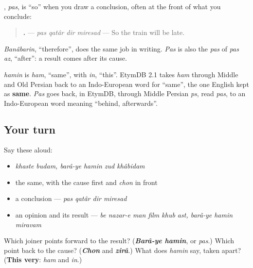 \begin{grammarlens}[title={Grammar Lens: pas, the short one}]
\textbf{}, \emph{pas}, is \textquotedblleft{}so\textquotedblright{} when you draw a conclusion, often at the front of what you conclude:

\begin{quote}
\textbf{   .} — \emph{pas qatâr dir miresad} — So the train will be late.
\end{quote}

\emph{Banâbarin}, \textquotedblleft{}therefore\textquotedblright{}, does the same job in writing. \emph{Pas} is also the \emph{pas} of \emph{pas az}, \textquotedblleft{}after\textquotedblright{}: a result comes after its cause.
\end{grammarlens}

\begin{cousinweb}
\emph{hamin} is \emph{ham}, \textquotedblleft{}same\textquotedblright{}, with \emph{in}, \textquotedblleft{}this\textquotedblright{}. EtymDB 2.1 takes \emph{ham} through Middle and Old Persian back to an Indo-European word for \textquotedblleft{}same\textquotedblright{}, the one English kept as \textbf{same}. \emph{Pas} goes back, in EtymDB, through Middle Persian \emph{ps}, read \emph{pas}, to an Indo-European word meaning \textquotedblleft{}behind, afterwards\textquotedblright{}.
\end{cousinweb}

\subsection*{Your turn}
Say these aloud:

\begin{itemize}
\raggedright
  \item \emph{khaste budam, barâ-ye hamin zud khâbidam}
  \item the same, with the cause first and \emph{chon} in front
  \item a conclusion — \emph{pas qatâr dir miresad}
  \item an opinion and its result — \emph{be nazar-e man film khub ast, barâ-ye hamin miravam}
\end{itemize}

\begin{tcolorbox}[breakable,colback=teal!4,colframe=teal!35!black,title={Before you move on}]
Which joiner points forward to the result? (\emph{\textbf{Barâ-ye hamin}}, or \emph{pas}.) Which point back to the cause? (\emph{\textbf{Chon}} and \emph{\textbf{zirâ}}.) What does \emph{hamin} say, taken apart? (\textbf{This very}: \emph{ham} and \emph{in}.)
\end{tcolorbox}
